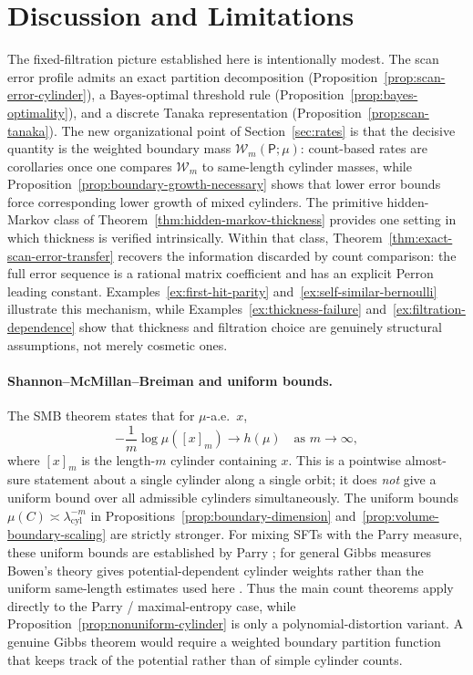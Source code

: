 \section{Discussion and Limitations}
\label{sec:discussion}

The fixed-filtration picture established here is intentionally modest.  The
scan error profile admits an exact partition decomposition
(Proposition~\ref{prop:scan-error-cylinder}), a Bayes-optimal threshold rule
(Proposition~\ref{prop:bayes-optimality}), and a discrete Tanaka
representation (Proposition~\ref{prop:scan-tanaka}).  The new organizational
point of Section~\ref{sec:rates} is that the decisive quantity is the weighted
boundary mass $\mathcal{W}_m(\mathsf{P};\mu)$: count-based rates are corollaries once
one compares $\mathcal{W}_m$ to same-length cylinder masses, while
Proposition~\ref{prop:boundary-growth-necessary} shows that lower error bounds
force corresponding lower growth of mixed cylinders.  The primitive
hidden-Markov class of Theorem~\ref{thm:hidden-markov-thickness} provides one
setting in which thickness is verified intrinsically.
Within that class, Theorem~\ref{thm:exact-scan-error-transfer} recovers the
information discarded by count comparison: the full error sequence is a
rational matrix coefficient and has an explicit Perron leading constant.
Examples~\ref{ex:first-hit-parity}
and~\ref{ex:self-similar-bernoulli} illustrate this mechanism, while
Examples~\ref{ex:thickness-failure} and~\ref{ex:filtration-dependence} show
that thickness and filtration choice are genuinely structural assumptions, not
merely cosmetic ones.

\paragraph{Shannon--McMillan--Breiman and uniform bounds.}
The SMB theorem \cite{Shannon1948,McMillan1953,Breiman1957} states that for
$\mu$-a.e.\ $x$,
\[
-\frac{1}{m}\log\mu([x]_m)\to h(\mu)
\quad\text{as }m\to\infty,
\]
where $[x]_m$ is the length-$m$ cylinder containing $x$.  This is a pointwise
almost-sure statement about a single cylinder along a single orbit; it does
\emph{not} give a uniform bound over all admissible cylinders simultaneously.
The uniform bounds $\mu(C)\asymp\lambda_{\mathrm{cyl}}^{-m}$ in
Propositions~\ref{prop:boundary-dimension} and~\ref{prop:volume-boundary-scaling}
are strictly stronger.  For mixing SFTs with the Parry measure, these
uniform bounds are established by Parry \cite{Parry1964}; for general Gibbs
measures Bowen's theory gives potential-dependent cylinder weights rather
than the uniform same-length estimates used here \cite{Bowen1975}.  Thus the
main count theorems apply directly to the Parry / maximal-entropy case, while
Proposition~\ref{prop:nonuniform-cylinder} is only a polynomial-distortion
variant.  A genuine Gibbs theorem would require a weighted boundary partition
function that keeps track of the potential rather than of simple cylinder
counts.

